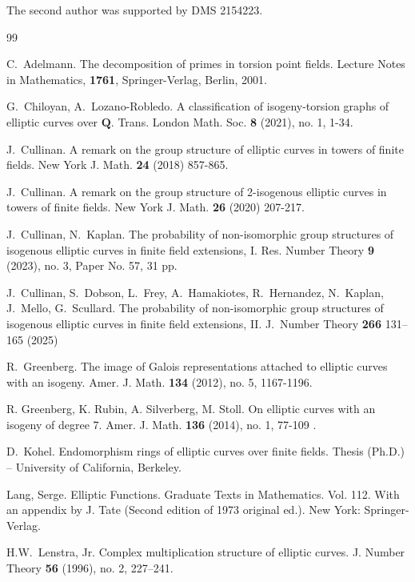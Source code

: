 \documentclass{amsart}
\newcommand{\Q}{\mathbf{Q}}
\numberwithin{equation}{section}
\theoremstyle{plain}
\theoremstyle{remark}
\begin{document}
The second author was supported by DMS 2154223.


\begin{thebibliography}{99}

 C.~Adelmann. The decomposition of primes in torsion point fields. Lecture Notes in Mathematics, \textbf{1761}, Springer-Verlag, Berlin, 2001.

 G.~Chiloyan, A.~Lozano-Robledo.  A classification of isogeny-torsion graphs of elliptic curves over $\Q$. Trans. London Math. Soc. \textbf{8} (2021), no. 1, 1-34.

 {J.~Cullinan.} 
A remark on the group structure of elliptic curves in towers of finite fields.
New York J. Math. {\bf 24} (2018) 857-865.

 {J.~Cullinan.}  A remark on the group structure of 2-isogenous elliptic curves in towers of finite fields. {New York J. Math.} \textbf{26}  (2020) 207-217. 

 {J.~Cullinan, N.~Kaplan.} The probability of non-isomorphic group structures of isogenous elliptic
curves in finite field extensions, I. Res. Number Theory \textbf{9} (2023), no. 3, Paper No. 57, 31 pp.

 J.~Cullinan, S.~Dobson, L.~Frey, A.~Hamakiotes, R.~Hernandez, N.~Kaplan, J.~Mello, G.~Scullard. The probability of non-isomorphic group structures of isogenous elliptic curves in finite field extensions, II. J.~Number Theory \textbf{266} 131--165 (2025)

 R.~Greenberg. The image of Galois representations attached to elliptic curves with an isogeny. Amer. J. Math. \textbf{134} (2012), no. 5, 1167-1196.

 R. Greenberg, K. Rubin, A. Silverberg, M. Stoll. On elliptic curves with an isogeny of degree 7.  Amer. J. Math. \textbf{136}  (2014), no. 1,  77-109 .

 D.~Kohel. Endomorphism rings of elliptic curves over finite fields. Thesis (Ph.D.) -- University of California, Berkeley.

 {Lang, Serge.} Elliptic Functions. Graduate Texts in Mathematics. Vol. 112. With an appendix by J. Tate (Second edition of 1973 original ed.). New York: Springer-Verlag.

H.W.~Lenstra, Jr. Complex multiplication structure of elliptic curves.
{J. Number Theory} {\bf 56} (1996), no. 2, 227--241. 


\end{thebibliography}
\end{document}
